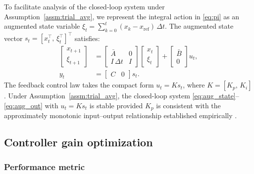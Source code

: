 To facilitate analysis of the closed-loop system under
Assumption~\ref{assm:trial_avg}, we represent the integral action in
\eqref{eq:pi} as an augmented state variable $\xi_{t} = \sum_{k=0}^{t}
(x_{k} - x_{\mathrm{ref}})\,\Delta t$. The augmented state vector
$s_{t} = [x_{t}^{\top},\,\xi_{t}^{\top}]^{\top}$ satisfies:
%
\begin{align}
    \begin{bmatrix} x_{t+1} \\ \xi_{t+1} \end{bmatrix}
    &= \begin{bmatrix} \bar{A} & 0 \\ I\,\Delta t & I \end{bmatrix}
       \begin{bmatrix} x_{t} \\ \xi_{t} \end{bmatrix}
    +  \begin{bmatrix} \bar{B} \\ 0 \end{bmatrix} u_{t},
    \label{eq:aug_state} \\
    y_{t} &= \begin{bmatrix} C & 0 \end{bmatrix} s_{t}.
    \label{eq:aug_out}
\end{align}
%
The feedback control law takes the compact form $u_{t} = K s_{t}$,
where $K = [K_{p},\,K_{i}]$. Under Assumption~\ref{assm:trial_avg}, the
closed-loop system \eqref{eq:aug_state}--\eqref{eq:aug_out} with $u_{t}
= K s_{t}$ is stable provided $K_{p}$ is consistent with the
approximately monotonic input--output relationship established
empirically \citep{Astrom1995}.

\subsection*{Controller gain optimization}
\label{sec:gain_opt}

\subsubsection*{Performance metric}

